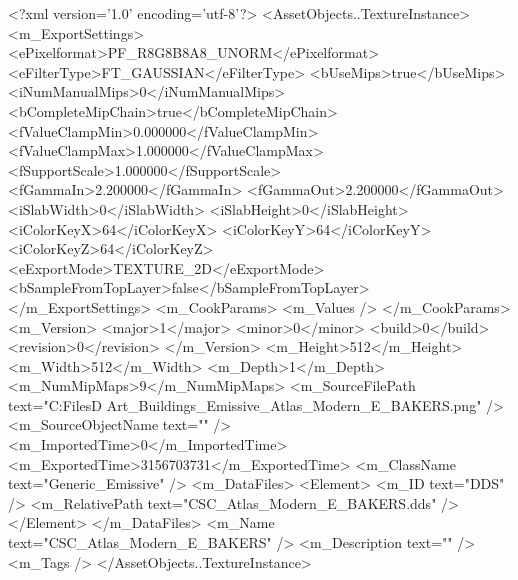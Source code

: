 <?xml version='1.0' encoding='utf-8'?>
<AssetObjects..TextureInstance>
  <m_ExportSettings>
    <ePixelformat>PF_R8G8B8A8_UNORM</ePixelformat>
    <eFilterType>FT_GAUSSIAN</eFilterType>
    <bUseMips>true</bUseMips>
    <iNumManualMips>0</iNumManualMips>
    <bCompleteMipChain>true</bCompleteMipChain>
    <fValueClampMin>0.000000</fValueClampMin>
    <fValueClampMax>1.000000</fValueClampMax>
    <fSupportScale>1.000000</fSupportScale>
    <fGammaIn>2.200000</fGammaIn>
    <fGammaOut>2.200000</fGammaOut>
    <iSlabWidth>0</iSlabWidth>
    <iSlabHeight>0</iSlabHeight>
    <iColorKeyX>64</iColorKeyX>
    <iColorKeyY>64</iColorKeyY>
    <iColorKeyZ>64</iColorKeyZ>
    <eExportMode>TEXTURE_2D</eExportMode>
    <bSampleFromTopLayer>false</bSampleFromTopLayer>
  </m_ExportSettings>
  <m_CookParams>
    <m_Values />
  </m_CookParams>
  <m_Version>
    <major>1</major>
    <minor>0</minor>
    <build>0</build>
    <revision>0</revision>
  </m_Version>
  <m_Height>512</m_Height>
  <m_Width>512</m_Width>
  <m_Depth>1</m_Depth>
  <m_NumMipMaps>9</m_NumMipMaps>
  <m_SourceFilePath text="C:\Users\Shadow\Desktop\Working Files\3D Art\Textures\CSC_Buildings_Emissive\Current\textures\CSC_Atlas_Modern_E_BAKERS.png" />
  <m_SourceObjectName text="" />
  <m_ImportedTime>0</m_ImportedTime>
  <m_ExportedTime>3156703731</m_ExportedTime>
  <m_ClassName text="Generic_Emissive" />
  <m_DataFiles>
    <Element>
      <m_ID text="DDS" />
      <m_RelativePath text="CSC_Atlas_Modern_E_BAKERS.dds" />
    </Element>
  </m_DataFiles>
  <m_Name text="CSC_Atlas_Modern_E_BAKERS" />
  <m_Description text="" />
  <m_Tags />
</AssetObjects..TextureInstance>